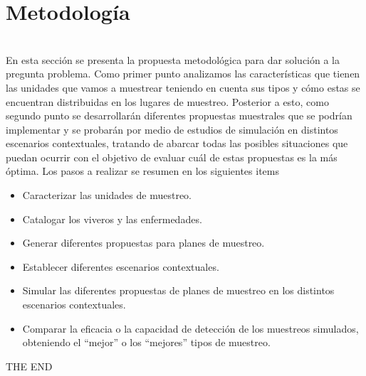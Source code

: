 \chapter{Metodolog\'{i}a}
~\\En esta secci\'{o}n se presenta la propuesta metodol\'{o}gica para dar soluci\'{o}n a la pregunta problema. Como primer punto analizamos las caracter\'{i}sticas que tienen las unidades que vamos a muestrear teniendo en cuenta sus tipos y c\'{o}mo estas se encuentran distribuidas en los lugares de muestreo. Posterior a esto, como segundo punto se desarrollar\'{a}n diferentes propuestas muestrales que se podr\'{i}an implementar y se probar\'{a}n por medio de estudios de simulaci\'{o}n en distintos escenarios contextuales, tratando de abarcar todas las posibles situaciones que puedan ocurrir con el objetivo de evaluar cu\'{a}l de estas propuestas es la m\'{a}s \'{o}ptima. Los pasos a realizar se resumen en los siguientes items

\begin{itemize}
\item Caracterizar las unidades de muestreo.
\item Catalogar los viveros y las enfermedades.
\item Generar diferentes propuestas para planes de muestreo.
\item Establecer diferentes escenarios contextuales.
\item Simular las diferentes propuestas de planes de muestreo en los distintos escenarios contextuales.
\item Comparar la eficacia o la capacidad de detecci\'{o}n de los muestreos simulados, obteniendo el ``mejor'' o los ``mejores'' tipos de muestreo. 
\end{itemize}

\begin{center}
THE END
\end{center}